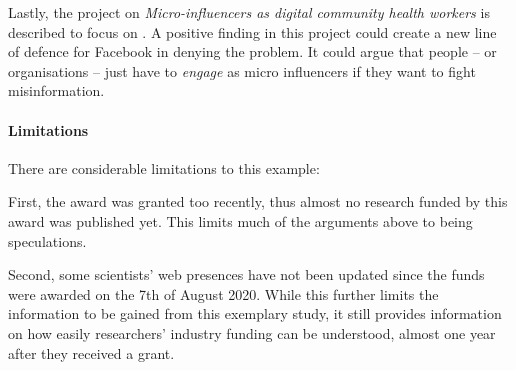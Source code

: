 Lastly, the project on \emph{Micro-influencers as digital community health workers} is described to focus on  \citep{cottingham_projects_nodate}.
A positive finding in this project could create a new line of defence for Facebook in denying the problem.
It could argue that people -- or organisations -- just have to \textit{engage} as micro influencers if they want to fight misinformation.

\paragraph{Limitations}
There are considerable limitations to this example:

First, the award was granted too recently, thus almost no research funded by this award was published yet. 
This limits much of the arguments above to being speculations.

Second, some scientists' web presences have not been updated since the funds were awarded on the 7th of August 2020.
While this further limits the information to be gained from this exemplary study, it still provides information on how easily researchers' industry funding can be understood, almost one year after they received a grant.